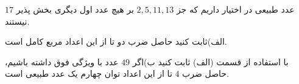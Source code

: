 \exercise
$17$
عدد طبیعی در اختیار داریم که جز
$2, 5, 11, 13$
بر هیچ عدد اول دیگری بخش پذیر نیستند.

الف)ثابت کنید حاصل ضرب دو تا از این اعداد مربع کامل است.

ب)اگر
$49$
عدد با ویژگی فوق داشته باشیم‫‪،‬‬ با استفاده از قسمت (الف) ثابت کنید حاصل ضرب
$4$
تا از این اعداد توان چهارم یک عدد طبیعی است.